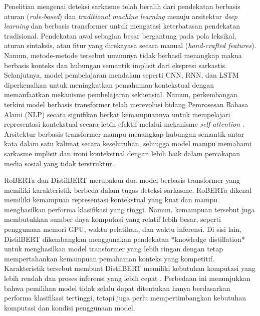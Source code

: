 Penelitian mengenai deteksi sarkasme telah beralih dari pendekatan berbasis aturan (\textit{rule-based}) dan \textit{traditional machine learning} menuju arsitektur \textit{deep learning} dan berbasis transformer untuk mengatasi keterbatasan pendekatan tradisional. Pendekatan awal sebagian besar bergantung pada pola leksikal, aturan sintaksis, atau fitur yang direkayasa secara manual (\textit{hand-crafted features}). Namun, metode-metode tersebut umumnya tidak berhasil menangkap makna berbasis konteks dan hubungan semantik implisit dari ekspresi sarkastis. Selanjutnya, model pembelajaran mendalam seperti CNN, RNN, dan LSTM diperkenalkan untuk meningkatkan pemahaman kontekstual dengan memanfaatkan mekanisme pembelajaran sekuensial. Namun, perkembangan terkini model berbasis transformer telah merevolusi bidang Pemrosesan Bahasa Alami (NLP) secara signifikan berkat kemampuannya untuk mempelajari representasi kontekstual secara lebih efektif melalui mekanisme \textit{self-attention} \cite{zhang2025enhancing}. Arsitektur berbasis transformer mampu menangkap hubungan semantik antar kata dalam satu kalimat secara keseluruhan, sehingga model mampu memahami sarkasme implisit dan ironi kontekstual dengan lebih baik dalam percakapan media sosial yang tidak terstruktur.

RoBERTa dan DistilBERT merupakan dua model berbasis transformer yang memiliki karakteristik berbeda dalam tugas deteksi sarkasme. RoBERTa dikenal memiliki kemampuan representasi kontekstual yang kuat dan mampu menghasilkan performa klasifikasi yang tinggi. Namun, kemampuan tersebut juga membutuhkan sumber daya komputasi yang relatif lebih besar, seperti penggunaan memori GPU, waktu pelatihan, dan waktu inferensi. Di sisi lain, DistilBERT dikembangkan menggunakan pendekatan *knowledge distillation* untuk menghasilkan model transformer yang lebih ringan dengan tetap mempertahankan kemampuan pemahaman konteks yang kompetitif. Karakteristik tersebut membuat DistilBERT memiliki kebutuhan komputasi yang lebih rendah dan proses inferensi yang lebih cepat \cite{dubey2025unpacking}. Perbedaan ini menunjukkan bahwa pemilihan model tidak selalu dapat ditentukan hanya berdasarkan performa klasifikasi tertinggi, tetapi juga perlu mempertimbangkan kebutuhan komputasi dan kondisi penggunaan model.


